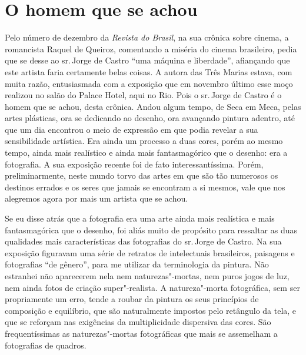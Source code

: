 
\chapter{O homem que se achou}

Pelo número de dezembro da \emph{Revista do Brasil}, na sua crônica
sobre cinema, a romancista Raquel de Queiroz, comentando a miséria do
cinema brasileiro, pedia que se desse ao sr.\,Jorge de Castro ``uma
máquina e liberdade'', afiançando que este artista faria certamente
belas coisas. A autora das Três Marias estava, com muita razão,
entusiasmada com a exposição que em novembro último esse moço realizou
no salão do Palace Hotel, aqui no Rio. Pois o sr.\,Jorge de Castro é o
homem que se achou, desta crônica. Andou algum tempo, de Seca em Meca,
pelas artes plásticas, ora se dedicando ao desenho, ora avançando
pintura adentro, até que um dia encontrou o meio de expressão em que
podia revelar a sua sensibilidade artística. Era ainda um processo a
duas cores, porém ao mesmo tempo, ainda mais realístico e ainda mais
fantasmagórico que o desenho: era a fotografia. A sua exposição recente
foi de fato interessantíssima. Porém, preliminarmente, neste mundo torvo
das artes em que são tão numerosos os destinos errados e os seres que
jamais se encontram a si mesmos, vale que nos alegremos agora por mais
um artista que se achou.

Se eu disse atrás que a fotografia era uma arte ainda mais realística e
mais fantasmagórica que o desenho, foi aliás muito de propósito para
ressaltar as duas qualidades mais características das fotografias do sr.\,Jorge de Castro. Na sua exposição figuravam uma série de retratos de
intelectuais brasileiros, paisagens e fotografias ``de gênero'', para me
utilizar da terminologia da pintura. Não estranhei não aparecerem nela
nem naturezas"-mortas, nem puros jogos de luz, nem ainda fotos de criação
super"-realista. A natureza"-morta fotográfica, sem ser propriamente um
erro, tende a roubar da pintura os seus princípios de composição e
equilíbrio, que são naturalmente impostos pelo retângulo da tela, e que
se reforçam nas exigências da multiplicidade dispersiva das cores. São
frequentíssimas as naturezas"-mortas fotográficas que mais se assemelham
a fotografias de quadros.

